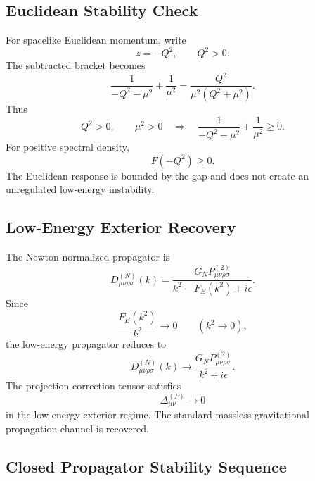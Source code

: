 \documentclass[11pt]{article}
\begin{document}
\subsection{Euclidean Stability Check}

For spacelike Euclidean momentum, write
\begin{equation}
z=-Q^2,
\qquad
Q^2>0.
\end{equation}
The subtracted bracket becomes
\begin{equation}
\frac{1}{-Q^2-\mu^2}
+
\frac{1}{\mu^2}
=
\frac{Q^2}{\mu^2(Q^2+\mu^2)}.
\end{equation}
Thus
\begin{equation}
\boxed{
Q^2>0,
\qquad
\mu^2>0
\quad\Longrightarrow\quad
\frac{1}{-Q^2-\mu^2}
+
\frac{1}{\mu^2}
\geq0.
}
\end{equation}
For positive spectral density,
\begin{equation}
\boxed{
F(-Q^2)\geq0.
}
\end{equation}
The Euclidean response is bounded by the gap and does not create an unregulated
low-energy instability.

\subsection{Low-Energy Exterior Recovery}

The Newton-normalized propagator is
\begin{equation}
\boxed{
D_{\mu\nu\rho\sigma}^{(N)}(k)
=
\frac{
G_NP_{\mu\nu\rho\sigma}^{(2)}
}{
k^2-F_E(k^2)+i\epsilon
}.
}
\end{equation}
Since
\begin{equation}
\frac{F_E(k^2)}{k^2}\rightarrow0
\qquad
(k^2\rightarrow0),
\end{equation}
the low-energy propagator reduces to
\begin{equation}
\boxed{
D_{\mu\nu\rho\sigma}^{(N)}(k)
\rightarrow
\frac{
G_NP_{\mu\nu\rho\sigma}^{(2)}
}{
k^2+i\epsilon
}.
}
\end{equation}
The projection correction tensor satisfies
\begin{equation}
\boxed{
\Delta_{\mu\nu}^{(P)}
\rightarrow0
}
\end{equation}
in the low-energy exterior regime. The standard massless gravitational
propagation channel is recovered.

\subsection{Closed Propagator Stability Sequence}
\end{document}
